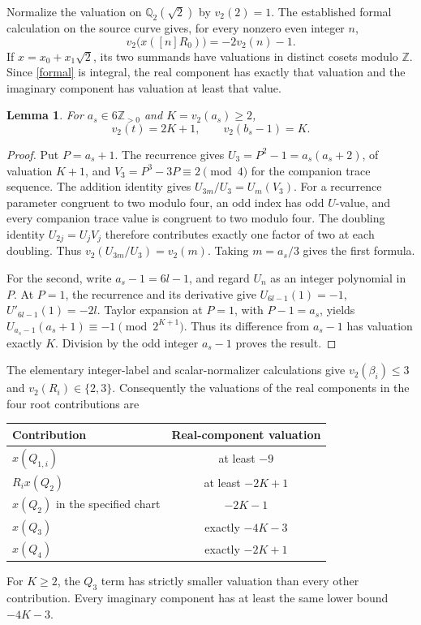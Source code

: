 \documentclass[11pt]{article}
\newtheorem{lemma}{Lemma}\newtheorem{theorem}[lemma]{Theorem}
\newcommand{\Q}{\mathbb Q}\newcommand{\Z}{\mathbb Z}
\begin{document}
Normalize the valuation on \(\Q_2(\sqrt2)\) by \(v_2(2)=1\).
The established formal calculation on the source curve \cite{Formal} gives, for
every nonzero even integer \(n\),
\begin{equation}\label{formal}
 v_2\bigl(x([n]R_0)\bigr)=-2v_2(n)-1.
\end{equation}
If \(x=x_0+x_1\sqrt2\), its two summands have valuations in
distinct cosets modulo \(\Z\). Since \eqref{formal} is integral,
the real component has exactly that valuation and the imaginary
component has valuation at least that value.

\begin{lemma}\label{Lucas}
For \(a_s\in6\Z_{>0}\) and \(K=v_2(a_s)\ge2\),
\[
 v_2(t)=2K+1,\qquad v_2(b_s-1)=K.
\]
\end{lemma}
\begin{proof}
Put \(P=a_s+1\). The recurrence gives
\(U_3=P^2-1=a_s(a_s+2)\), of valuation \(K+1\), and
\(V_3=P^3-3P\equiv2\pmod4\) for the companion trace sequence.
The addition identity gives \(U_{3m}/U_3=U_m(V_3)\).
For a recurrence parameter congruent to two modulo four, an odd
index has odd \(U\)-value, and every companion trace value is
congruent to two modulo four. The doubling identity
\(U_{2j}=U_jV_j\) therefore contributes exactly one factor of
two at each doubling. Thus \(v_2(U_{3m}/U_3)=v_2(m)\).
Taking \(m=a_s/3\) gives the first formula.

For the second, write \(a_s-1=6l-1\), and regard \(U_n\)
as an integer polynomial in \(P\). At \(P=1\), the recurrence
and its derivative give
\(U_{6l-1}(1)=-1\), \(U'_{6l-1}(1)=-2l\).
Taylor expansion at \(P=1\), with \(P-1=a_s\), yields
\(U_{a_s-1}(a_s+1)\equiv-1\pmod{2^{K+1}}\).
Thus its difference from \(a_s-1\) has valuation exactly \(K\).
Division by the odd integer \(a_s-1\) proves the result.
\end{proof}

The elementary integer-label and scalar-normalizer calculations \cite{Scalar} give
\(v_2(\beta_i)\le3\) and \(v_2(R_i)\in\{2,3\}\).
Consequently the valuations of the real components in the four root
contributions are
\begin{center}
\begin{tabular}{lc}
\toprule
Contribution & Real-component valuation\\
\midrule
\(x(Q_{1,i})\) & at least \(-9\)\\
\(R_i x(Q_2)\) & at least \(-2K+1\)\\
\(x(Q_2)\) in the specified chart & \(-2K-1\)\\
\(x(Q_3)\) & exactly \(-4K-3\)\\
\(x(Q_4)\) & exactly \(-2K+1\)\\
\bottomrule
\end{tabular}
\end{center}
For \(K\ge2\), the \(Q_3\) term has strictly smaller valuation
than every other contribution. Every imaginary component has at
least the same lower bound \(-4K-3\).
\end{document}
